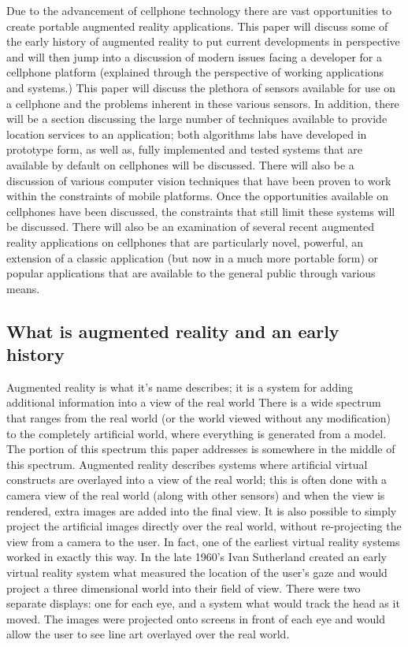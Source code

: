 \documentclass{acm_proc_article-sp}
\begin{document}
Due to the advancement of cellphone technology there are vast opportunities to create portable augmented reality applications.  This paper will discuss some of the early history of augmented reality to put current developments in perspective and will then jump into a discussion of modern issues facing a developer for a cellphone platform (explained through the perspective of working applications and systems.)  This paper will discuss the plethora of sensors available for use on a cellphone and the problems inherent in these various sensors.  In addition, there will be a section discussing the large number of techniques available to provide location services to an application; both algorithms labs have developed in prototype form, as well as, fully implemented and tested systems that are available by default on cellphones will be discussed. There will also be a discussion of various computer vision techniques that have been proven to work within the constraints of mobile platforms.  Once the opportunities available on cellphones have been discussed, the constraints that still limit these systems will be discussed. There will also be an examination of several recent augmented reality applications on cellphones that are particularly novel, powerful, an extension of a classic application (but now in a much more portable form) or popular applications that are available to the general public through various means.

\subsection{What is augmented reality and an early history}

Augmented reality is what it's name describes; it is a system for adding additional information into a view of the real world \cite{mizell1994virtual} There is a wide spectrum that ranges from the real world (or the world viewed without any modification) to the completely artificial world, where everything is generated from a model. \cite{milgram1994taxonomy} The portion of this spectrum this paper addresses is somewhere in the middle of this spectrum.   Augmented reality describes systems where artificial virtual constructs are overlayed into a view of the real world; this is often done with a camera view of the real world (along with other sensors) and when the view is rendered, extra images are added into the final view.  It is also possible to simply project the artificial images directly over the real world, without re-projecting the view from a camera to the user.  In fact, one of the earliest virtual reality systems worked in exactly this way.  In the late 1960's  Ivan Sutherland created an early virtual reality system what measured the location of the user's gaze and would project a three dimensional world into their field of view.  There were two separate displays: one for each eye, and a system what would track the head as it moved.  The images were projected onto screens in front of each eye and would allow the user to see line art overlayed over the real world. \cite{Sutherland:1968:HTD:1476589.1476686}
\end{document}
